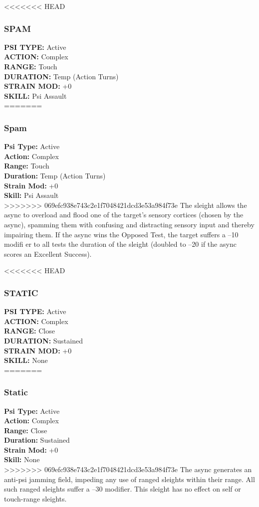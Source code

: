 <<<<<<< HEAD \subsubsection{SPAM} \textbf{PSI TYPE:} Active \\ \textbf{ACTION:} Complex \\ \textbf{RANGE:} Touch \\ \textbf{DURATION:} Temp (Action Turns) \\ \textbf{STRAIN MOD:} +0 \\ \textbf{SKILL:} Psi Assault \\ ======= \subsubsection{Spam} \textbf{Psi Type:} Active \\ \textbf{Action:} Complex \\ \textbf{Range:} Touch \\ \textbf{Duration:} Temp (Action Turns) \\ \textbf{Strain Mod:} +0 \\ \textbf{Skill:} Psi Assault \\ >>>>>>> 069efc938e743c2e1f7048421dcd3e53a984f73e The sleight allows the async to overload and flood one of the target’s sensory cortices (chosen by the async), spamming them with confusing and distracting sensory input and thereby impairing them. If the async wins the Opposed Test, the target suffers a –10 modifi er to all tests the duration of the sleight (doubled to –20 if the async scores an Excellent Success). 

<<<<<<< HEAD \subsubsection{STATIC} \textbf{PSI TYPE:} Active \\ \textbf{ACTION:} Complex \\ \textbf{RANGE:} Close \\ \textbf{DURATION:} Sustained \\ \textbf{STRAIN MOD:} +0 \\ \textbf{SKILL:} None\\ ======= \subsubsection{Static} \textbf{Psi Type:} Active \\ \textbf{Action:} Complex \\ \textbf{Range:} Close \\ \textbf{Duration:} Sustained \\ \textbf{Strain Mod:} +0 \\ \textbf{Skill:} None\\ >>>>>>> 069efc938e743c2e1f7048421dcd3e53a984f73e The async generates an anti-psi jamming field, impeding any use of ranged sleights within their range. All such ranged sleights suffer a –30 modifier. This sleight has no effect on self or touch-range sleights. 


